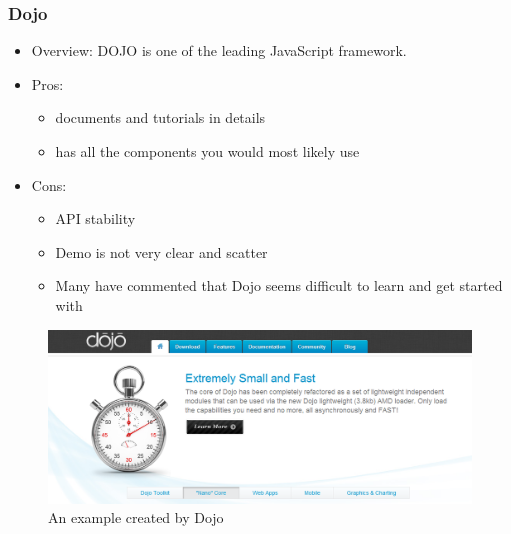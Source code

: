 \documentclass[14pt,a4paper]{extreport}
\begin{document}
		\subsubsection{Dojo}
			\begin{itemize}
				\item Overview: DOJO is one of the leading JavaScript framework.
				\item Pros: 
					\begin{itemize}
						\item documents and tutorials in details
						\item  has all the components you would most likely use
					\end{itemize}
				\item Cons:
					\begin{itemize}
						\item API stability
						\item Demo is not very clear and scatter
						\item Many have commented that Dojo seems difficult to learn and get started with
			
					\end{itemize}
			\end{itemize}
			
			\begin{figure}
				\begin{center}
				\includegraphics[scale=0.6]{Dojo.png}
				 \caption{An example created by Dojo}
				\end{center}			
			\end{figure}
\end{document}
